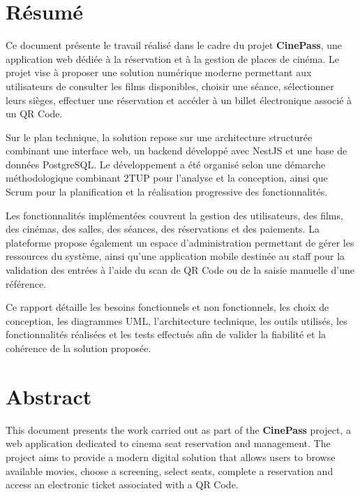\documentclass[12pt]{report}
\begin{document}
\chapter*{Résumé}

Ce document présente le travail réalisé dans le cadre du projet \textbf{CinePass},
une application web dédiée à la réservation et à la gestion de places de cinéma.
Le projet vise à proposer une solution numérique moderne permettant aux
utilisateurs de consulter les films disponibles, choisir une séance, sélectionner
leurs sièges, effectuer une réservation et accéder à un billet électronique
associé à un QR Code.

Sur le plan technique, la solution repose sur une architecture structurée
combinant une interface web, un backend développé avec NestJS et une base de
données PostgreSQL. Le développement a été organisé selon une démarche
méthodologique combinant 2TUP pour l'analyse et la conception, ainsi que Scrum
pour la planification et la réalisation progressive des fonctionnalités.

Les fonctionnalités implémentées couvrent la gestion des utilisateurs, des films,
des cinémas, des salles, des séances, des réservations et des paiements. La
plateforme propose également un espace d'administration permettant de gérer les
ressources du système, ainsi qu'une application mobile destinée au staff pour la
validation des entrées à l'aide du scan de QR Code ou de la saisie manuelle d'une
référence.

Ce rapport détaille les besoins fonctionnels et non fonctionnels, les choix de
conception, les diagrammes UML, l'architecture technique, les outils utilisés, les
fonctionnalités réalisées et les tests effectués afin de valider la fiabilité et
la cohérence de la solution proposée.

\newpage

\chapter*{Abstract}

This document presents the work carried out as part of the \textbf{CinePass}
project, a web application dedicated to cinema seat reservation and management.
The project aims to provide a modern digital solution that allows users to browse
available movies, choose a screening, select seats, complete a reservation and
access an electronic ticket associated with a QR Code.
\end{document}

